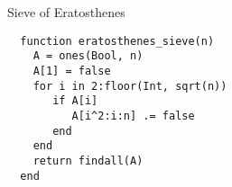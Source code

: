 \documentclass[9pt]{beamer}
\begin{document}
\begin{frame}[fragile]
  {Sieve of Eratosthenes}
  \begin{verbatim}
  function eratosthenes_sieve(n)
    A = ones(Bool, n)
    A[1] = false
    for i in 2:floor(Int, sqrt(n))
       if A[i]
          A[i^2:i:n] .= false
       end
    end
    return findall(A)
  end
  \end{verbatim}
\end{frame}
\end{document}
